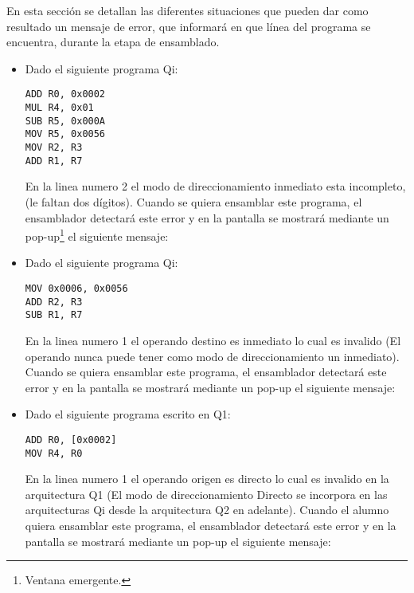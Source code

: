 \label{erroressintaxis}


En esta sección se detallan las diferentes situaciones que pueden dar como resultado un mensaje de error, que informará en que línea del programa se encuentra, durante la etapa de ensamblado.

\begin{itemize}

\item Dado el siguiente programa Qi:

\begin{verbatim}
ADD R0, 0x0002
MUL R4, 0x01
SUB R5, 0x000A
MOV R5, 0x0056
MOV R2, R3
ADD R1, R7
\end{verbatim}

En la linea numero 2 el modo de direccionamiento inmediato esta incompleto, (le faltan dos dígitos). Cuando se quiera ensamblar este programa, el ensamblador detectará este error y en la pantalla se mostrará mediante un pop-up\footnote{Ventana emergente.} el siguiente mensaje:
 

\item Dado el siguiente programa Qi:

\begin{verbatim}
MOV 0x0006, 0x0056
ADD R2, R3
SUB R1, R7
\end{verbatim}

En la linea numero 1 el operando destino es inmediato lo cual es invalido (El operando nunca puede tener como modo de direccionamiento un inmediato). Cuando se quiera ensamblar este programa, el ensamblador detectará este error y en la pantalla se mostrará mediante un pop-up el siguiente mensaje:


\item Dado el siguiente programa escrito en Q1:

\begin{verbatim}
ADD R0, [0x0002]
MOV R4, R0
\end{verbatim}

En la linea numero 1 el operando origen es directo lo cual es invalido en la arquitectura Q1 (El modo de direccionamiento Directo se incorpora en las arquitecturas Qi desde la arquitectura Q2 en adelante). Cuando el alumno quiera ensamblar este programa, el ensamblador detectará este error y en la pantalla se mostrará mediante un pop-up el siguiente mensaje:


\end{itemize}
